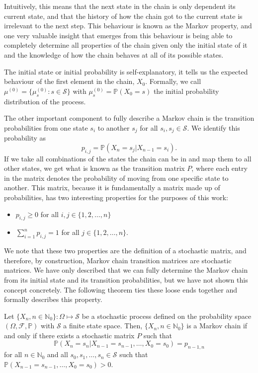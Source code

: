 Intuitively, this means that the next state in the chain  is only dependent its current state, and that the history of how the chain got to the current state is irrelevant to the next step. 
This behaviour is known as the Markov property, and one very valuable insight that emerges from this behaviour is being able to completely determine all properties of the chain given only the initial state of it and the knowledge of how the chain behaves at all of its possible states. 

The initial state or initial probability is self-explanatory, it tells us the expected behaviour of the first element in the chain, $X_0$. Formally, we call $\mu^{(0)} = \{ \mu_s^{(0)} : s \in \mathcal{S} \}$ with $\mu_s^{(0)} = \mathbb{P}(X_0 = s)$ the initial probability distribution of the process. 

The other important component to fully describe a Markov chain is the transition probabilities from one state $s_i$ to another $s_j$ for all $s_i, s_j \in \mathcal{S}$. We identify this probability as 
\[ p_{i,j} = \mathbb{P}(X_{n} = s_j | X_{n-1} = s_i). \]
If we take all combinations of the states the chain can be in and map them to all other states, we get what is known as the transition matrix $P$, where each entry in the matrix denotes the probability of moving from one specific state to another. This matrix, because it is fundamentally a matrix made up of probabilities, has two interesting properties for the purposes of this work: 
\begin{itemize}
	\item $p_{i,j} \geq 0$ for all $i,j \in \{ 1, 2, \ldots, n \}$\green{,}
	\item $\sum_{i=1}^{n} p_{i,j} = 1$ for all $j \in \{ 1, 2, \ldots, n \}$.  
\end{itemize}
We note that these two properties are the definition of a stochastic matrix, and therefore, by construction, Markov chain transition matrices are stochastic matrices. We have only described that we can fully determine the Markov chain from its initial state and its transition probabilities, but we have not shown this concept concretely. The following theorem ties these loose ends together and formally describes this property.

\begin{theorem}
	Let $\{ X_n, n \in \mathbb{N}_0 \}: \Omega \mapsto \mathcal{S}$ be a stochastic process defined on the probability space $(\Omega, \mathcal{F}, \mathbb{P})$ with $\mathcal{S}$ a finite state space. Then, $\{ X_n, n \in \mathbb{N}_0 \}$ is a Markov chain if and only if there exists a stochastic matrix $P$ such that 
	\[ \mathbb{P}(X_n = s_n | X_{n-1} = s_{n-1}, \ldots , X_0 = s_0) = p_{n-1, n} \]
	for all $n \in \mathbb{N}_0$ and all $s_0, s_1, \ldots , s_n \in \mathcal{S}$ such that $\mathbb{P}(X_{n-1} = s_{n-1}, \ldots , X_0 = s_0) > 0$. 
\end{theorem}

